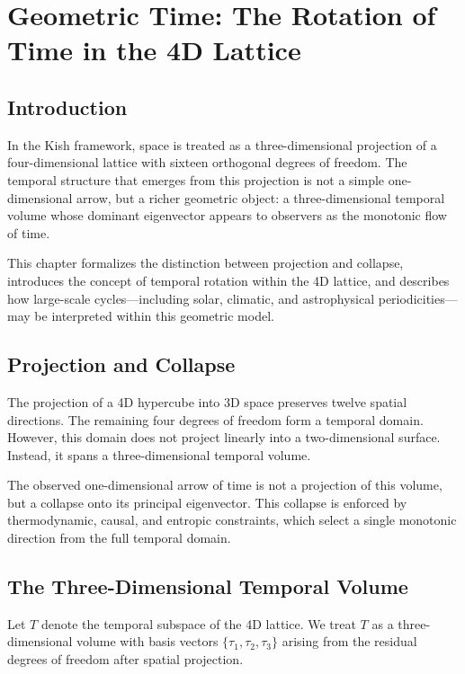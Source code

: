 \documentclass[11pt, letterpaper, openany]{book}
\begin{document}
\chapter{Geometric Time: The Rotation of Time in the 4D Lattice}
\label{chap:the_rotation_of_time}

\section{Introduction}

In the Kish framework, space is treated as a three-dimensional projection of a 
four-dimensional lattice with sixteen orthogonal degrees of freedom. 
The temporal structure that emerges from this projection is not a simple 
one-dimensional arrow, but a richer geometric object: a three-dimensional 
temporal volume whose dominant eigenvector appears to observers as the 
monotonic flow of time.

This chapter formalizes the distinction between projection and collapse, 
introduces the concept of temporal rotation within the 4D lattice, and 
describes how large-scale cycles---including solar, climatic, and 
astrophysical periodicities---may be interpreted within this geometric model.

\section{Projection and Collapse}

The projection of a 4D hypercube into 3D space preserves twelve spatial 
directions. The remaining four degrees of freedom form a temporal domain. 
However, this domain does not project linearly into a two-dimensional surface. 
Instead, it spans a three-dimensional temporal volume.

The observed one-dimensional arrow of time is not a projection of this volume, 
but a collapse onto its principal eigenvector. This collapse is enforced by 
thermodynamic, causal, and entropic constraints, which select a single 
monotonic direction from the full temporal domain.

\section{The Three-Dimensional Temporal Volume}

Let $T$ denote the temporal subspace of the 4D lattice. We treat $T$ as a 
three-dimensional volume with basis vectors $\{ \tau_1, \tau_2, \tau_3 \}$ 
arising from the residual degrees of freedom after spatial projection.
\end{document}
